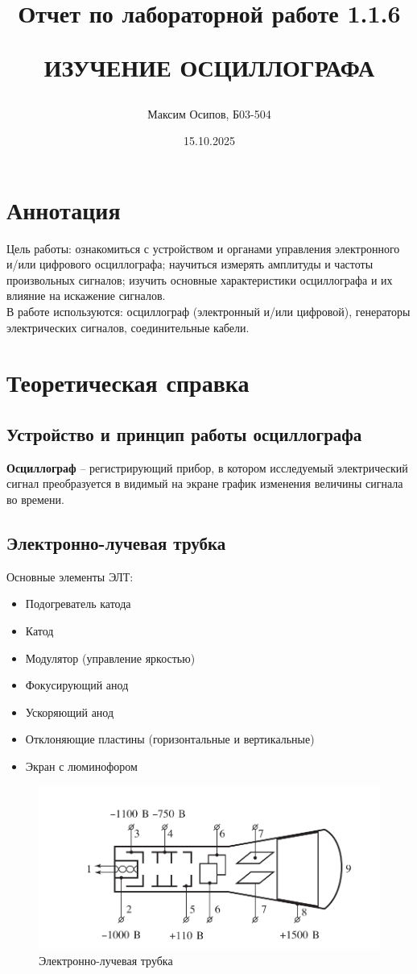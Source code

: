 \documentclass[a4paper, 12pt]{article}
\title{Отчет по лабораторной работе 1.1.6

ИЗУЧЕНИЕ ОСЦИЛЛОГРАФА}
\author{Максим Осипов, Б03-504}
\date{15.10.2025}
\begin{document}
\maketitle
\newpage
\section{Аннотация}
Цель работы: ознакомиться с устройством и органами управления
электронного и/или цифрового осциллографа; научиться измерять амплитуды и частоты произвольных сигналов; изучить основные характеристики осциллографа и их влияние на искажение сигналов.\\

\hspace{0,01cm}В работе используются: осциллограф (электронный и/или цифровой), генераторы электрических сигналов, соединительные кабели.

\section{Теоретическая справка}


\subsection*{Устройство и принцип работы осциллографа}

\textbf{Осциллограф} -- регистрирующий прибор, в котором исследуемый электрический сигнал преобразуется в видимый на экране график изменения величины сигнала во времени.

\subsection*{Электронно-лучевая трубка}

Основные элементы ЭЛТ:
\begin{itemize}
\item Подогреватель катода
\item Катод
\item Модулятор (управление яркостью)
\item Фокусирующий анод
\item Ускоряющий анод
\item Отклоняющие пластины (горизонтальные и вертикальные)
\item Экран с люминофором
\end{itemize}

\begin{figure}[h]
\centering
\includegraphics[width=0.9\linewidth]{рис 1.png}
\caption{Электронно-лучевая трубка}
\label{fig:voltage_current}
\end{figure}
\end{document}
